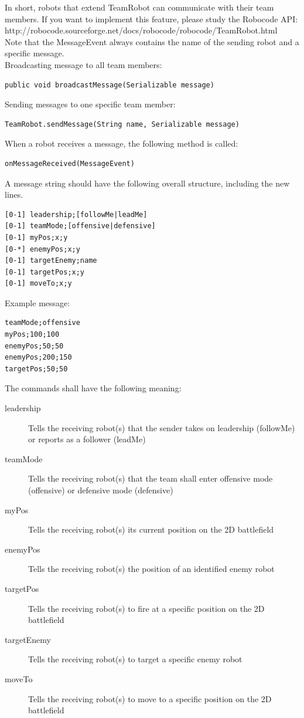 \documentclass{scrreprt}
\begin{document}
In short, robots that extend TeamRobot can communicate with their team members. If you want to implement this feature, please study the Robocode API:\\http://robocode.sourceforge.net/docs/robocode/robocode/TeamRobot.html\\Note that the MessageEvent always contains the name of the sending robot and a specific message.\\

Broadcasting message to all team members:
\begin{verbatim}
public void broadcastMessage(Serializable message)
\end{verbatim}

Sending messages to one specific team member:
\begin{verbatim}
TeamRobot.sendMessage(String name, Serializable message)
\end{verbatim}

When a robot receives a message, the following method is called:
\begin{verbatim}
onMessageReceived(MessageEvent)
\end{verbatim}

A message string should have the following overall structure, including the new lines.

\begin{verbatim}
[0-1] leadership;[followMe|leadMe]
[0-1] teamMode;[offensive|defensive]
[0-1] myPos;x;y
[0-*] enemyPos;x;y
[0-1] targetEnemy;name
[0-1] targetPos;x;y
[0-1] moveTo;x;y
\end{verbatim}

Example message:

\begin{verbatim}
teamMode;offensive
myPos;100;100
enemyPos;50;50
enemyPos;200;150
targetPos;50;50
\end{verbatim}

The commands shall have the following meaning:

\begin{description}
\item[leadership] Tells the receiving robot(s) that the sender takes on leadership (followMe) or reports as a follower (leadMe)
\item[teamMode] Tells the receiving robot(s) that the team shall enter offensive mode (offensive) or defensive mode (defensive)
\item[myPos] Tells the receiving robot(s) its current position on the 2D battlefield
\item[enemyPos] Tells the receiving robot(s) the position of an identified enemy robot
\item[targetPos] Tells the receiving robot(s) to fire at a specific position on the 2D battlefield
\item[targetEnemy] Tells the receiving robot(s) to target a specific enemy robot
\item[moveTo] Tells the receiving robot(s) to move to a specific position on the 2D battlefield
\end{description}
\end{document}
